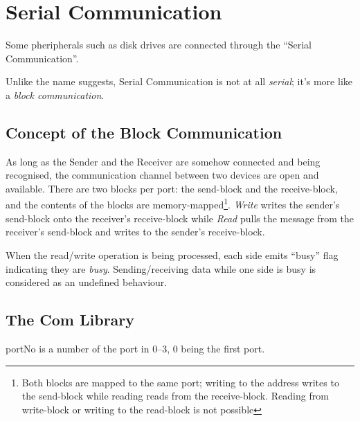 \chapter{Serial Communication}

Some pheripherals such as disk drives are connected through the ``Serial Communication''.

Unlike the name suggests, Serial Communication is not at all \emph{serial}; it's more like a \emph{block communication}.

\section{Concept of the Block Communication}

As long as the Sender and the Receiver are somehow connected and being recognised, the communication channel between two devices are open and available. There are two blocks per port: the send-block and the receive-block, and the contents of the blocks are memory-mapped\footnote{Both blocks are mapped to the same port; writing to the address writes to the send-block while reading reads from the receive-block. Reading from write-block or writing to the read-block is not possible}. \emph{Write} writes the sender's send-block onto the receiver's receive-block while \emph{Read} pulls the message from the receiver's send-block and writes to the sender's receive-block.

When the read/write operation is being processed, each side emits ``busy'' flag indicating they are \emph{busy}. Sending/receiving data while one side is busy is considered as an undefined behaviour.


\section{The Com Library}

portNo is a number of the port in 0--3, 0 being the first port.


